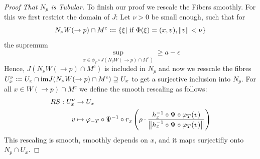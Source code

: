 	\begin{proof}[Proof That $N_p$ is Tubular]
		To finish our proof we rescale the Fibers smoothly. For this we first restrict the domain of $J$: Let $\nu>0$ be small enough, such that for 
		\begin{equation*}
			N_{\nu}W(\to p)\cap M^c\coloneq \{\xi|\text{ if }\Phi(\xi)=(x,v), \left\lVert v\right\rVert<\nu\}
		\end{equation*} the supremum
		\begin{equation*}
			\sup\limits_{x \in \phi_T\circ J \left( N_{\nu}W(\to p)\cap M^c \right)}\geq a-\epsilon
		\end{equation*} Hence, $J( N_{\nu}W(\to p)\cap M^c)$ is included in $N_p$ and now we resscale the fibres $U_x^{\nu}\coloneq  U_x\cap \mathrm{im} J( N_{\nu}W(\to p)\cap M^c)\supseteq U_x$ to get a surjective inclusion into $N_p$. 
		For all $x\in W(\to p)\cap M^c$ we define the smooth rescaling as follows: 
		\begin{align*}
			RS: U_x^{\nu} &\to U_x\\
			v &\mapsto \varphi_{-T}\circ \Psi^{-1} \circ r_x \left(\rho \cdot \frac{h_x^{-1}\circ \Psi \circ\varphi_T(v)}{\left\lVert h_x^{-1}\circ \Psi \circ\varphi_T(v)\right\rVert} \right)
		\end{align*} This rescaling is smooth, smoothly depends on $x$, and it maps surjectifly onto $N_p\cap U_x$. 
		
		
		
		
		
		
		
		
		
		\end{proof}
	
	

